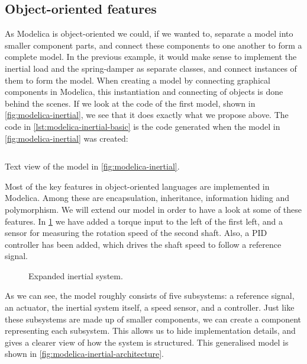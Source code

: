 \documentclass[\rootfolder/main.tex]{subfiles}
\begin{document}
\subsection{Object-oriented features}

As Modelica is object-oriented we could, if we wanted to, separate a model into smaller component parts, and connect these components to one another to form a complete model.
In the previous example, it would make sense to implement the inertial load and the spring-damper as separate classes, and connect instances of them to form the model.
When creating a model by connecting graphical components in Modelica, this instantiation and connecting of objects is done behind the scenes.
If we look at the code of the first model, shown in \cref{fig:modelica-inertial}, we see that it does exactly what we propose above.
The code in \cref{lst:modelica-inertial-basic} is the code generated when the model in \cref{fig:modelica-inertial} was created\footnotemark:


\begin{listing}[ht]
    \inputminted{Modelica}{\rootfolder/Models/MasterProject/Models/InertialBasic.mo}
    \caption{Text view of the model in \cref{fig:modelica-inertial}.\label{lst:modelica-inertial-basic}}
\end{listing}

Most of the key features in object-oriented languages are implemented in Modelica.
Among these are encapsulation, inheritance, information hiding and polymorphism.
We will extend our model in order to have a look at some of these features.
In \cref{fig:modelica-inertial-expanded} we have added a torque input to the left of the first left, and a sensor for measuring the rotation speed of the second shaft.
Also, a PID controller has been added, which drives the shaft speed to follow a reference signal.

\begin{figure}[ht]
    \caption{Expanded inertial system.\label{fig:modelica-inertial-expanded}}
\end{figure}

As we can see, the model roughly consists of five subsystems: a reference signal, an actuator, the inertial system itself, a speed sensor, and a controller.
Just like these subsystems are made up of smaller components, we can create a component representing each subsystem.
This allows us to hide implementation details, and gives a clearer view of how the system is structured.
This generalised model is shown in \cref{fig:modelica-inertial-architecture}.
\end{document}
